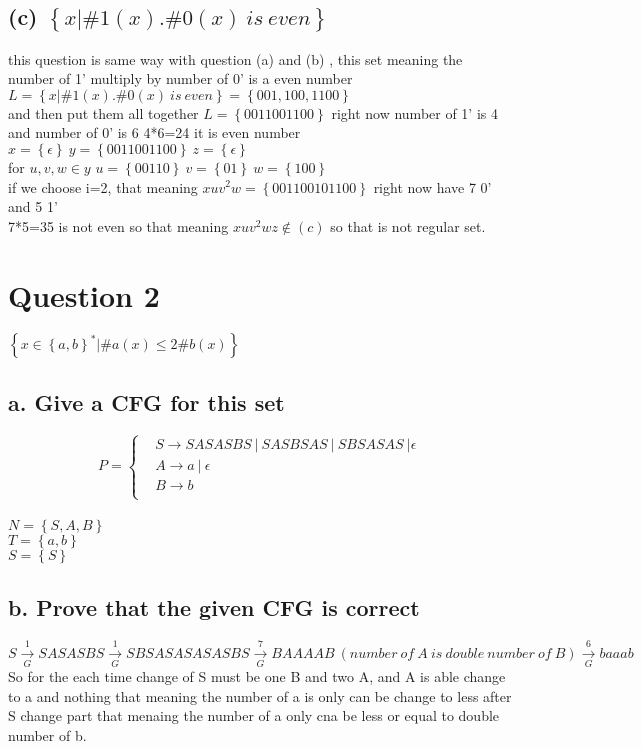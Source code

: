 \documentclass[12pt]{article}
\begin{document}
\subsection*{(c) $\left\{x|\#1\left(x\right).\#0\left(x\right)~is~even\right\}$}\nonumber
this question is same way with question (a) and (b) , this set meaning the number of 1' multiply by number of 0' is a even number 
$L=\left\{x|\#1\left(x\right).\#0\left(x\right)~is~even\right\}=\left\{001,100,1100\right\}$\\
and then put them all together $L=\left\{0011001100\right\}$ right now number of 1' is 4 and number of 0' is 6 4*6=24 it is even number\\
$x=\left\{\epsilon\right\}~y=\left\{0011001100\right\}~z=\left\{\epsilon\right\}$\\
for $u,v,w\in y$ 
$u=\left\{00110\right\}~v=\left\{01\right\}~w=\left\{100\right\}$\\
if we choose i=2, that meaning $xuv^{2}w=\left\{00110 0101 100\right\}$ right now have 7 0' and 5 1'\\
7*5=35 is not even so that meaning $xuv^2wz\notin \left(c\right)$ so that is not regular set.\\ 

\section*{Question 2}\nonumber
$\left\{x\in\left\{a,b\right\}^*|\#a\left(x\right)\leq2\#b\left(x\right)\right\}$\\
\subsection*{a. Give a CFG for this set} \nonumber
$$
P=\left\{
    \begin{aligned}
    &S\rightarrow SASASBS~|~ SASBSAS~|~SBSASAS~|\epsilon\\
    &A\rightarrow a~|~\epsilon\\
    &B\rightarrow b\\
    \end{aligned}
\right.
$$\\
$N=\left\{S,A,B\right\}$\\
$T=\left\{a,b\right\}$\\
$S=\left\{S\right\}$\\

\subsection*{b. Prove that the given CFG is correct}\nonumber
$S\xrightarrow[G]{1}SASASBS\xrightarrow[G]{1}SBSASASASASBS\xrightarrow[G]{7}BAAAAB~(number~of~A~is~double~number~of~B)\xrightarrow[G]{6}baaab$\\
So for the each time change of S must be one B and two A, and A is able change to a and nothing that meaning the number of a is only can be change to less after 
S change part that menaing the number of a only cna be less or equal to double number of b.\\
  
\end{document}
